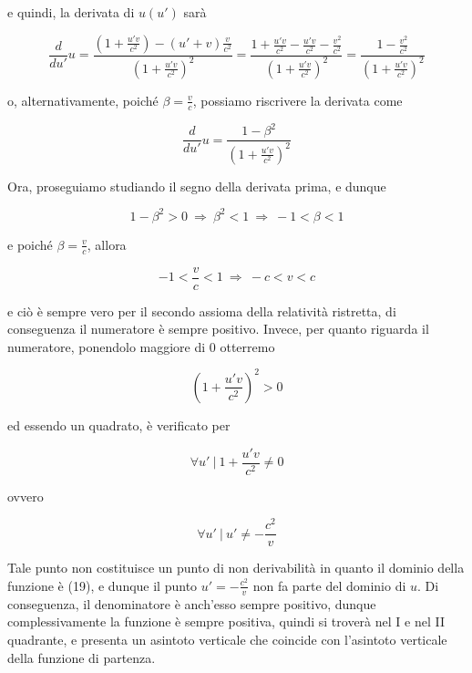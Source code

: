 \documentclass{article}
\begin{document}
e quindi, la derivata di \(u(u')\) sarà

\begin{equation}
    \frac{d}{du'} u = \frac{(1 + \frac{u'v}{c^2}) - (u' + v) \frac{v}{c^2}}{\left(1 + \frac{u'v}{c^2}\right)^2} = \frac{1 + \frac{u'v}{c^2} - \frac{u'v}{c^2} - \frac{v^2}{c^2}}{\left(1 + \frac{u'v}{c^2}\right)^2} = \frac{1 - \frac{v^2}{c^2}}{\left(1 + \frac{u'v}{c^2}\right)^2}
\end{equation}

o, alternativamente, poiché \(\beta = \frac{v}{c}\), possiamo
riscrivere la derivata come

\begin{equation}
    \frac{d}{du'} u = \frac{1 - \beta^2}{\left(1 + \frac{u'v}{c^2}\right)^2}
\end{equation}

Ora, proseguiamo studiando il segno della derivata prima, e dunque

\begin{equation}
    1 - \beta^2 > 0\ \Rightarrow\ \beta^2 < 1\ \Rightarrow\ -1 < \beta < 1
\end{equation}

e poiché \(\beta = \frac{v}{c}\), allora

\begin{equation}
    -1 < \frac{v}{c} < 1\ \Rightarrow\ -c < v < c
\end{equation}

e ciò è sempre vero per il secondo assioma della relatività
ristretta, di conseguenza il numeratore è sempre positivo. Invece,
per quanto riguarda il numeratore, ponendolo maggiore di
0 otterremo

\begin{equation}
    \left(1 + \frac{u'v}{c^2}\right)^2 > 0
\end{equation}

ed essendo un quadrato, è verificato per

\begin{equation}
    \forall u'\ |\ 1 + \frac{u'v}{c^2} \neq 0
\end{equation}

ovvero

\begin{equation}
    \forall u'\ |\ u' \neq - \frac{c^2}{v}
\end{equation}

Tale punto non costituisce un punto di non derivabilità
in quanto il dominio della funzione è (19), e dunque
il punto \(u' = - \frac{c^2}{v}\) non fa parte del
dominio di \(u\). Di conseguenza, il denominatore è
anch'esso sempre positivo, dunque complessivamente
la funzione è sempre positiva, quindi si troverà nel
I e nel II quadrante, e presenta un asintoto verticale
che coincide con l'asintoto verticale della funzione
di partenza.\hfill\break
\end{document}
